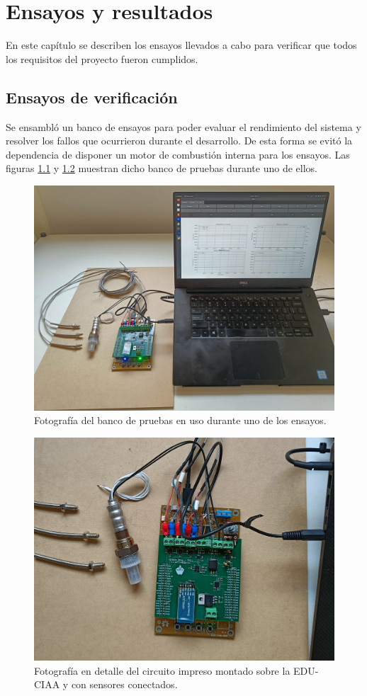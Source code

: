 \chapter{Ensayos y resultados}

\label{Chapter4}

En este capítulo se describen los ensayos llevados a cabo para verificar que todos los requisitos del proyecto fueron cumplidos.

\section{Ensayos de verificación}

Se ensambló un banco de ensayos para poder evaluar el rendimiento del sistema y resolver los fallos que ocurrieron durante el desarrollo. De esta forma se evitó la dependencia de disponer un motor de combustión interna para los ensayos. Las figuras \ref{fig:banco-pruebas-1} y \ref{fig:banco-pruebas-2} muestran dicho banco de pruebas durante uno de ellos.

\begin{figure}[htpb]
\centering
\includegraphics[width=.85\textwidth]{./Figures/banco-pruebas-1.jpg}
\caption{Fotografía del banco de pruebas en uso durante uno de los ensayos.}
\label{fig:banco-pruebas-1}
\end{figure}

\begin{figure}[htpb]
\centering
\includegraphics[width=.85\textwidth]{./Figures/banco-pruebas-2.jpg}
\caption{Fotografía en detalle del circuito impreso montado sobre la EDU-CIAA y con sensores conectados.}
\label{fig:banco-pruebas-2}
\end{figure}
\break
